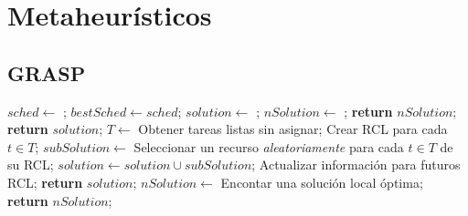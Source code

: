 

\section{Metaheurísticos}

\subsection{GRASP}
\label{alg:grasp}
\begin{algorithmic}[1]
	\State $sched \gets$ ;
		\State $bestSched \gets sched$;
	\EndIf
\EndWhile
{}
	\State $solution \gets$ ;
	\State $nSolution \gets$ ;
		\State \textbf{return} $nSolution$;
	\EndIf
	\State \textbf{return} $solution$;
\EndProcedure
{}
		\State $T \gets$ Obtener tareas listas sin asignar;
		\State Crear RCL para cada $t \in T$;
		\State $subSolution \gets$ Seleccionar un recurso \emph{aleatoriamente} para cada $t \in T$ de su RCL;
		\State $solution \gets solution \cup subSolution$;
		\State Actualizar información para futuros RCL;
	\EndWhile
	\State \textbf{return} $solution$;
\EndProcedure
{}
	\State $nSolution \gets$ Encontar una solución local óptima;
	\State \textbf{return} $nSolution$;
\EndProcedure
\end{algorithmic}

